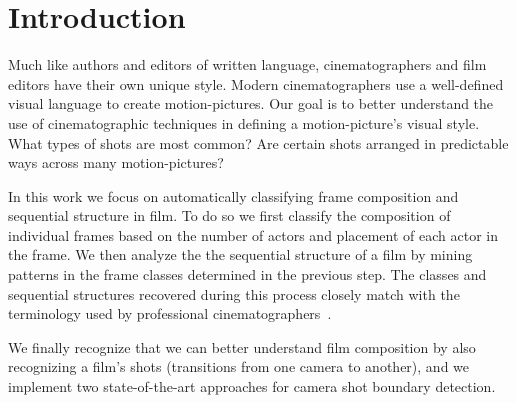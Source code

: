 \section*{Introduction}

Much like authors and editors of written language, cinematographers and film editors have their own unique style.
Modern cinematographers use a well-defined visual language to create motion-pictures. Our goal is to better understand the use of cinematographic techniques in defining a motion-picture's visual style. What types of shots are most common? Are certain shots arranged in predictable ways across many motion-pictures?

In this work we focus on automatically classifying frame composition and sequential structure in film.  To do so we first classify the composition of individual frames based on the number of actors and placement of each actor in the frame.  We then analyze the the sequential structure of a film by mining patterns in the frame classes determined in the previous step.  The classes and sequential structures recovered during this process closely match with the terminology used by professional cinematographers~\cite{arijon_grammar_1991}.  

We finally recognize that we can better understand film composition by also recognizing a film's shots (transitions from one camera to another), and we implement two state-of-the-art approaches for camera shot boundary detection.


